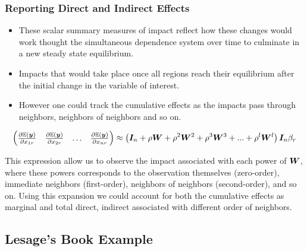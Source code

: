\documentclass[english,10pt]{beamer}\usepackage[]{graphicx}\usepackage[]{xcolor}
\begin{document}
\begin{frame}
    \frametitle{Reporting Direct and Indirect Effects}
    \begin{itemize}
      \item These scalar summary measures of impact reflect how these changes would work thought the simultaneous dependence system over time to culminate in a new steady state equilibrium. 
      \item Impacts that would take place once all regions reach their equilibrium after the initial change in the variable of interest. 
      \item However one could track the cumulative effects as the impacts pass through neighbors, neighbors of neighbors and so on. 
    \end{itemize}
    
\begin{equation}
  \begin{pmatrix}
  \frac{\partial \mathbb{E}(\bm y)}{\partial x_{1r}} & \frac{\partial \mathbb{E}(\bm y)}{\partial x_{2r}} & \hdots & \frac{\partial \mathbb{E}(\bm y)}{\partial x_{nr}} 
   \end{pmatrix} \approx \left(\bm I_n  + \rho \bm W + \rho^2\bm W^2 + \rho^3\bm W^3 + ... + \rho^l\bm W^l\right)\bm I_n\beta_r  
\end{equation}
    
This expression allow us to observe the impact associated with each power of $\bm W$, where these powers corresponds to the observation themselves (zero-order), immediate neighbors (first-order), neighbors of neighbors (second-order), and so on. Using this expansion we could account for both the cumulative effects as marginal and total direct, indirect associated with different order of neighbors.
\end{frame}


\subsection{Lesage's Book Example}
\end{document}
